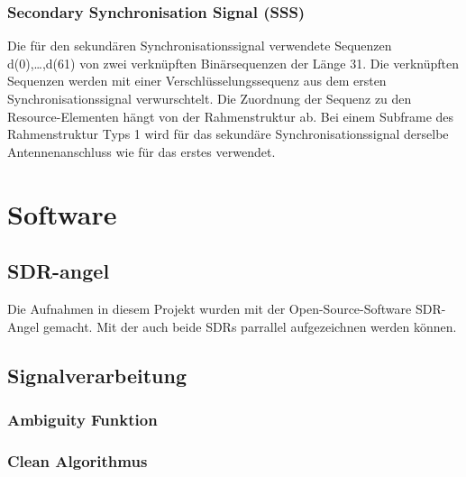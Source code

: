 \subsubsection{Secondary Synchronisation Signal (SSS)}
Die für den sekundären Synchronisationssignal verwendete Sequenzen d(0),…,d(61) von zwei verknüpften Binärsequenzen der Länge 31. Die verknüpften Sequenzen werden mit einer Verschlüsselungssequenz aus dem ersten Synchronisationssignal verwurschtelt. Die Zuordnung der Sequenz zu den Resource-Elementen hängt von der Rahmenstruktur ab. Bei einem Subframe des Rahmenstruktur Typs 1 wird für das sekundäre Synchronisationssignal derselbe Antennenanschluss wie für das erstes verwendet. ~\cite[S.~183]{etsi2021136} 
\section{Software}
\subsection{SDR-angel}
Die Aufnahmen in diesem Projekt wurden mit der Open-Source-Software SDR-Angel gemacht. Mit der auch beide SDRs parrallel aufgezeichnen werden können.
\subsection{Signalverarbeitung}
\subsubsection{Ambiguity Funktion}\label{sct:ambiguity_function}
\subsubsection{Clean Algorithmus}
